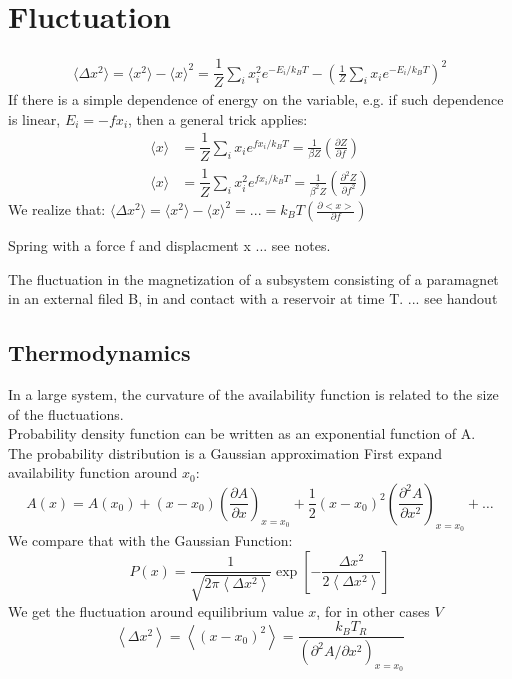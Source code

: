 \documentclass[12pt,a4paper]{article}
\begin{document}
\section{Fluctuation}
\begin{align*}
    \langle \Delta x^2\rangle = \langle x^2\rangle -\langle x\rangle ^2 
    =\dfrac{1}{Z}\sum_i x_i^2 e^{-E_i/k_BT} - (\frac{1}{Z}\sum_i x_i e^{-E_i/k_BT})^2
\end{align*}
If there is a simple dependence of energy on the variable, 
e.g. if such dependence is linear, $E_i=-fx_i$, then a general trick applies:
\begin{align*}
    \langle x\rangle &= \dfrac{1}{Z}\sum_i x_i e^{fx_i/k_BT} = \frac{1}{\beta Z}(\frac{\partial Z}{\partial f})\\
    \langle x\rangle &= \dfrac{1}{Z}\sum_i x_i^2 e^{fx_i/k_BT} = \frac{1}{\beta^2 Z}(\frac{\partial^2 Z}{\partial f^2})
\end{align*}
We realize that:
$\langle \Delta x^2\rangle = \langle x^2\rangle -\langle x\rangle ^2 = ... = k_BT(\frac{\partial <x>}{\partial f})$\\
\begin{example}
    {Spring with a force f and displacment x}
    {... see notes.}
\end{example}
\begin{example}
    {The fluctuation in the magnetization of a subsystem consisting of a paramagnet in an external filed B, in and contact with a reservoir at time T.}
    {... see handout}
\end{example}
\subsection{Thermodynamics}
In a large system, the curvature of the availability function is related to the size of the fluctuations.\\
Probability density function can be written as an exponential function of A.\\

The probability distribution is a Gaussian approximation
First expand availability function around $x_0$:
$$
A(x)=A\left(x_0\right)+\left(x-x_0\right)\left(\frac{\partial A}{\partial x}\right)_{x=x_0}+\frac{1}{2}\left(x-x_0\right)^2\left(\frac{\partial^2 A}{\partial x^2}\right)_{x=x_0}+\ldots
$$
We compare that with the Gaussian Function:
$$
P(x)=\frac{1}{\sqrt{2 \pi\left\langle\Delta x^2\right\rangle}} \exp \left[-\frac{\Delta x^2}{2\left\langle\Delta x^2\right\rangle}\right]
$$
We get the fluctuation around equilibrium value $x$, for in other cases $V$
$$
\left\langle\Delta x^2\right\rangle=\left\langle\left(x-x_0\right)^2\right\rangle=\frac{k_B T_R}{\left(\partial^2 A / \partial x^2\right)_{x=x_0}}
$$
\end{document}
